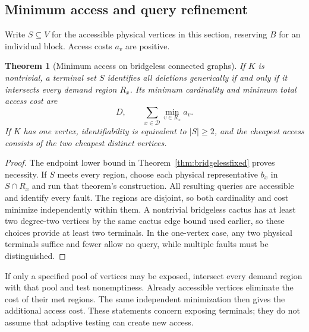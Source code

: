 \documentclass[11pt,letterpaper]{article}
\newtheorem{theorem}{Theorem}
\begin{document}
\subsection{Minimum access and query refinement}
Write $S\subseteq V$ for the accessible physical vertices in this section, reserving $B$ for an individual block. Access costs $a_v$ are positive.

\begin{theorem}[Minimum access on bridgeless connected graphs]\label{thm:bridgelessaccess}
If $K$ is nontrivial, a terminal set $S$ identifies all deletions generically if and only if it intersects every demand region $R_x$. Its minimum cardinality and minimum total access cost are
\[
 D,\qquad \sum_{x\in\mathcal D}\min_{v\in R_x}a_v.
\]
If $K$ has one vertex, identifiability is equivalent to $|S|\ge2$, and the cheapest access consists of the two cheapest distinct vertices.
\end{theorem}
\begin{proof}
The endpoint lower bound in Theorem~\ref{thm:bridgelessfixed} proves necessity. If $S$ meets every region, choose each physical representative $b_x$ in $S\cap R_x$ and run that theorem's construction. All resulting queries are accessible and identify every fault. The regions are disjoint, so both cardinality and cost minimize independently within them. A nontrivial bridgeless cactus has at least two degree-two vertices by the same cactus edge bound used earlier, so these choices provide at least two terminals. In the one-vertex case, any two physical terminals suffice and fewer allow no query, while multiple faults must be distinguished.
\end{proof}

If only a specified pool of vertices may be exposed, intersect every demand region with that pool and test nonemptiness. Already accessible vertices eliminate the cost of their met regions. The same independent minimization then gives the additional access cost. These statements concern exposing terminals; they do not assume that adaptive testing can create new access.
\end{document}
